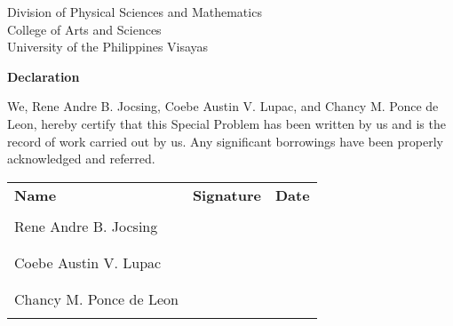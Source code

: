 \begin{center}
	Division of Physical Sciences and Mathematics\\
	College of Arts and Sciences\\
	University of the Philippines Visayas

		\textbf{Declaration}
		\end{center}

We,  Rene Andre B. Jocsing, Coebe Austin V. Lupac, and Chancy M. Ponce de Leon, hereby certify that this Special Problem has been written by us  and is the record of work carried out by us. Any significant borrowings have been properly acknowledged and referred.

\begin{tabular}{lll}
    \bfseries Name  & \bfseries Signature & \bfseries Date\\ \\
    Rene Andre B. Jocsing & & \\
    \signaturerule & \signaturerule & \signaturerule\\
    \\
    Coebe Austin V. Lupac & & \\
    \signaturerule & \signaturerule & \signaturerule\\
    \\
    Chancy M. Ponce de Leon & & \\
    \signaturerule & \signaturerule & \signaturerule\\
\end{tabular}


